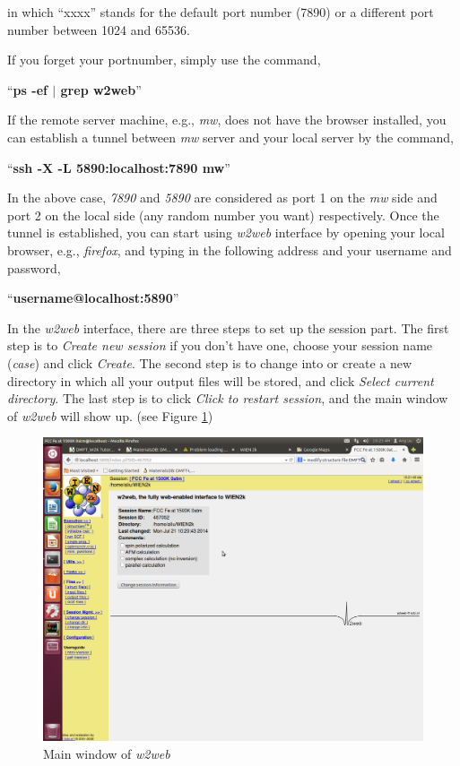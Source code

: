 \documentclass[12 pt]{article}
\begin{document}
\begin{itemize}[leftmargin=0.2in]
  in which ``xxxx'' stands for the default port number (7890) or a different port number between 1024 and 65536. 

  If you forget your portnumber, simply use the command,

  ``\textbf{ps -ef $|$ grep w2web}''

  If the remote server machine, e.g., \emph{mw}, does not have the browser installed, you can establish a tunnel 
between \emph{mw} server and your local server by the command, 

  ``\textbf{ssh -X -L 5890:localhost:7890 mw}''

  In the above case, \emph{7890} and \emph{5890} are considered as port 1 on the \emph{mw} side and port 2 on the 
local side (any random number you want) respectively. Once the tunnel is established, you can start using \emph{w2web}
 interface by opening your local browser, e.g., \emph{firefox}, and typing in the following address and your username
 and password,

  ``\textbf{username@localhost:5890}''

  In the \emph{w2web} interface, there are three steps to set up the session part. The first step is to \emph{Create 
new session} if you don't have one, choose your session name (\emph{case}) and click \emph{Create}. The second step 
is to change into or create a new directory in which all your output files will be stored, and click \emph{Select 
current directory}. The last step is to click \emph{Click to restart session}, and the main window of \emph{w2web} 
will show up. (see Figure \ref{Main window of w2web})

  \begin{figure}[h]
    \centering
    \caption{Main window of \emph{w2web}}
    \label{Main window of w2web}
    \vspace{2ex}
    \includegraphics[scale=0.35, trim=2.3cm 0cm 0cm 4.3cm, clip=true]{Mainwindow}
  \end{figure}


\end{itemize}
\end{document}
